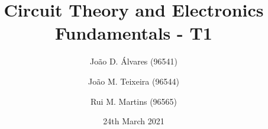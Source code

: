 \title{\textbf{Circuit Theory and Electronics Fundamentals - T1}}
\author[1]{João D. Álvares (96541)}
\author[1]{João M. Teixeira (96544)}
\author[1]{Rui M. Martins (96565)}


\date{24th March 2021}